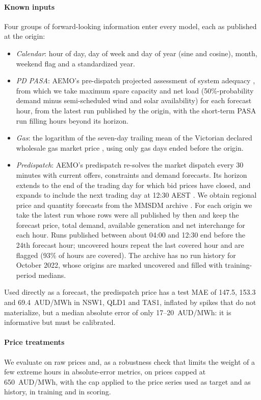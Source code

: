 \documentclass[preprint,12pt]{elsarticle}
\begin{document}
\paragraph{Known inputs} Four groups of forward-looking information enter every model, each as published at the origin:
\begin{itemize}
\item \emph{Calendar}: hour of day, day of week and day of year (sine and cosine), month, weekend flag and a standardized year.
\item \emph{PD PASA}: AEMO's pre-dispatch projected assessment of system adequacy \citep{aemo2025mmsdm}, from which we take maximum spare capacity and net load (50\%-probability demand minus semi-scheduled wind and solar availability) for each forecast hour, from the latest run published by the origin, with the short-term PASA run filling hours beyond its horizon.
\item \emph{Gas}: the logarithm of the seven-day trailing mean of the Victorian declared wholesale gas market price \citep{aemo2025dwgm}, using only gas days ended before the origin.
\item \emph{Predispatch}: AEMO's predispatch re-solves the market dispatch every 30 minutes with current offers, constraints and demand forecasts. Its horizon extends to the end of the trading day for which bid prices have closed, and expands to include the next trading day at 12:30 AEST \citep{aemo2026predispatch}. We obtain regional price and quantity forecasts from the MMSDM archive \citep{aemo2025mmsdm}. For each origin we take the latest run whose rows were all published by then and keep the forecast price, total demand, available generation and net interchange for each hour. Runs published between about 04:00 and 12:30 end before the 24th forecast hour; uncovered hours repeat the last covered hour and are flagged (93\% of hours are covered). The archive has no run history for October 2022, whose origins are marked uncovered and filled with training-period medians.
\end{itemize}
Used directly as a forecast, the predispatch price has a test MAE of 147.5, 153.3 and 69.4~AUD/MWh in NSW1, QLD1 and TAS1, inflated by spikes that do not materialize, but a median absolute error of only 17--20~AUD/MWh: it is informative but must be calibrated.

\paragraph{Price treatments} We evaluate on raw prices and, as a robustness check that limits the weight of a few extreme hours in absolute-error metrics, on prices capped at 650~AUD/MWh, with the cap applied to the price series used as target and as history, in training and in scoring.
\end{document}
